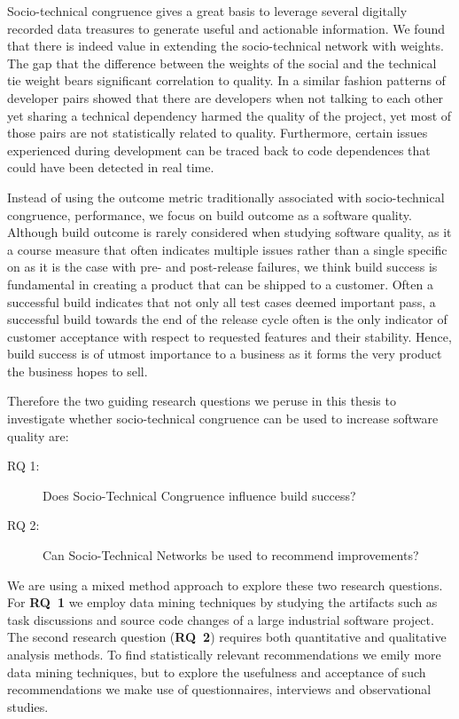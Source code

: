 Socio-technical congruence gives a great basis to leverage several digitally recorded data treasures to generate useful and actionable information.
We found that there is indeed value in extending the socio-technical network with weights.
The gap that the difference between the weights of the social and the technical tie weight bears significant correlation to quality.
In a similar fashion patterns of developer pairs showed that there are developers when not talking to each other yet sharing a technical dependency harmed the quality of the project, yet most of those pairs are not statistically related to quality.
Furthermore, certain issues experienced during development can be traced back to code dependences that could have been detected in real time.


Instead of using the outcome metric traditionally associated with socio-technical congruence, performance, we focus on build outcome as a software quality.
Although build outcome is rarely considered when studying software quality, as it a course measure that often indicates multiple issues rather than a single specific on as it is the case with pre- and post-release failures, we think build success is fundamental in creating a product that can be shipped to a customer.
Often a successful build indicates that not only all test cases deemed important pass, a successful build towards the end of the release cycle often is the only indicator of customer acceptance with respect to requested features and their stability.
Hence, build success is of utmost importance to a business as it forms the very product the business hopes to sell.

Therefore the two guiding research questions we peruse in this thesis to investigate whether socio-technical congruence can be used to increase software quality are:
\begin{description}
\item[RQ 1:] Does Socio-Technical Congruence influence build success?
\item[RQ 2:] Can Socio-Technical Networks be used to recommend improvements?
\end{description}

We are using a mixed method approach to explore these two research questions.
For \textbf{RQ~1} we employ data mining techniques by studying the artifacts such as task discussions and source code changes of a large industrial software project.
The second research question (\textbf{RQ~2}) requires both quantitative and qualitative analysis methods.
To find statistically relevant recommendations we emily more data mining techniques, but to explore the usefulness and acceptance of such recommendations we make use of questionnaires, interviews and observational studies.






